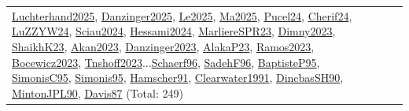 {\begin{longtable}{p{3cm}r>{\raggedright\arraybackslash}p{6cm}>{\raggedright\arraybackslash}p{6cm}>{\raggedright\arraybackslash}p{8cm}}
\hyperref[detail:Luchterhand2025]{Luchterhand2025}, \hyperref[detail:Danzinger2025]{Danzinger2025}, \hyperref[detail:Le2025]{Le2025}, \hyperref[detail:Ma2025]{Ma2025}, \hyperref[detail:Pucel24]{Pucel24}, \hyperref[detail:Cherif24]{Cherif24}, \hyperref[detail:LuZZYW24]{LuZZYW24}, \hyperref[detail:Sciau2024]{Sciau2024}, \hyperref[detail:Hessami2024]{Hessami2024}, \hyperref[detail:MarliereSPR23]{MarliereSPR23}, \hyperref[detail:Dimny2023]{Dimny2023}, \hyperref[detail:ShaikhK23]{ShaikhK23}, \hyperref[detail:Akan2023]{Akan2023}, \hyperref[detail:Danzinger2023]{Danzinger2023}, \hyperref[detail:AlakaP23]{AlakaP23}, \hyperref[detail:Ramos2023]{Ramos2023}, \hyperref[detail:Bocewicz2023]{Bocewicz2023}, \hyperref[detail:Tnshoff2023]{Tnshoff2023}...\hyperref[detail:Schaerf96]{Schaerf96}, \hyperref[detail:SadehF96]{SadehF96}, \hyperref[detail:BaptisteP95]{BaptisteP95}, \hyperref[detail:SimonisC95]{SimonisC95}, \hyperref[detail:Simonis95]{Simonis95}, \hyperref[detail:Hamscher91]{Hamscher91}, \hyperref[detail:Clearwater1991]{Clearwater1991}, \hyperref[detail:DincbasSH90]{DincbasSH90}, \hyperref[detail:MintonJPL90]{MintonJPL90}, \hyperref[detail:Davis87]{Davis87} (Total: 249)\\

\end{longtable}}
